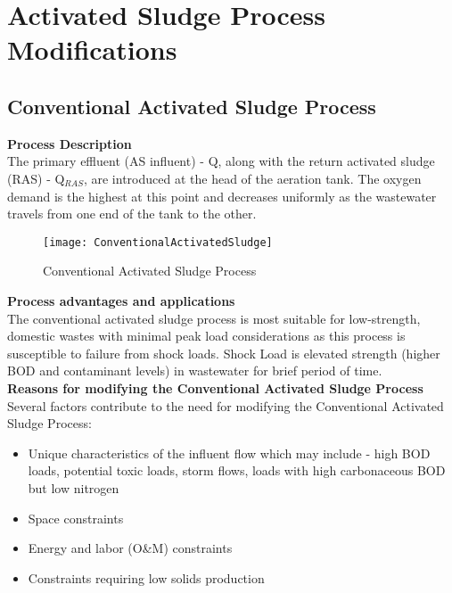 \section{Activated Sludge Process Modifications}

\subsection{Conventional Activated Sludge Process}

\noindent \textbf{Process Description}\\
\noindent The primary effluent (AS influent) - Q, along with the return activated sludge (RAS) - Q$_{RAS}$, are introduced at the head of the aeration tank.  The oxygen demand is the highest at this point and decreases uniformly as the wastewater travels from one end of the tank to the other.\\  


\begin{figure}[h!]
\begin{center}
\texttt{[image: ConventionalActivatedSludge]}
\caption{Conventional Activated Sludge Process}
\end{center}
\end{figure}

\noindent \textbf{Process advantages and applications}\\
The conventional activated sludge process is most suitable for low-strength, domestic wastes with minimal peak load considerations as this process is susceptible to failure from shock loads.  Shock Load is elevated strength (higher BOD and contaminant levels) in wastewater for brief period of time.\\

\textbf{Reasons for modifying the Conventional Activated Sludge Process}\\
Several factors contribute to the need for modifying the Conventional Activated Sludge Process:
\begin{itemize}
\item Unique characteristics of the influent flow which may include - high BOD loads, potential toxic loads, storm flows, loads with high carbonaceous BOD but low nitrogen
\item Space constraints
\item Energy and labor (O\&M) constraints
\item Constraints requiring low solids production
\end{itemize}

